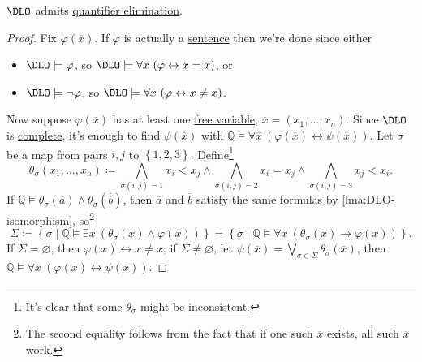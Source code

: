 \begin{theorem}\label{thm:DLO-QE}
	\(\DLO\) admits \hyperref[def:quantifier-elimination]{quantifier elimination}.
\end{theorem}
\begin{proof}
	Fix \(\varphi (\overline{x} )\). If \(\varphi \) is actually a \hyperref[def:sentence]{sentence} then we're done since either
	\begin{itemize}
		\item \(\DLO \models \varphi \), so \(\DLO \models \forall x\ (\varphi \leftrightarrow x = x)\), or
		\item \(\DLO \models \lnot \varphi \), so \(\DLO \models \forall x\ (\varphi \leftrightarrow x \neq x)\).
	\end{itemize}
	Now suppose \(\varphi (\overline{x} )\) has at least one \hyperref[def:free-variable]{free variable}, \(\overline{x} = (x_1, \dots , x_n)\). Since \(\DLO\) is \hyperref[def:theory-complete]{complete}, it's enough to find \(\psi (\overline{x} )\) with \(\mathbb{Q} \models \forall \overline{x} \ (\varphi (\overline{x} ) \leftrightarrow \psi (\overline{x} ))\). Let \(\sigma \) be a map from pairs \(i, j\) to \(\left\{ 1, 2, 3 \right\} \). Define\footnote{It's clear that some \(\theta _\sigma \) might be \hyperref[def:inconsistent]{inconsistent}.}
	\[
		\theta _\sigma (x_1, \dots , x_n) \coloneqq \bigwedge_{\sigma (i, j) = 1} x_i < x_j \land \bigwedge_{\sigma (i, j)=2} x_i = x_j \land \bigwedge_{\sigma (i, j)=3} x_j < x_i.
	\]
	If \(\mathbb{Q} \models \theta _\sigma (\overline{a} ) \land \theta _\sigma (\overline{b} )\), then \(\overline{a} \) and \(\overline{b} \) satisfy the same \hyperref[def:formula]{formulas} by \autoref{lma:DLO-isomorphism}, so\footnote{The second equality follows from the fact that if one such \(\overline{x} \) exists, all such \(\overline{x} \) work.}
	\[
		\Sigma
		\coloneqq \left\{ \sigma \mid \mathbb{Q} \models \exists \overline{x}\ (\theta _\sigma (\overline{x} ) \land \varphi (\overline{x} )) \right\}
		= \left\{ \sigma \mid \mathbb{Q} \models \forall \overline{x}\ (\theta _\sigma (\overline{x} ) \to \varphi (\overline{x} )) \right\}.
	\]
	If \(\Sigma = \varnothing \), then \(\varphi (x) \leftrightarrow x \neq x\); if \(\Sigma \neq \varnothing \), let \(\psi (\overline{x} ) = \bigvee_{\sigma \in \Sigma } \theta _\sigma (\overline{x} ) \), then \(\mathbb{Q} \models \forall \overline{x} \ (\varphi (\overline{x} ) \leftrightarrow \psi (\overline{x} ))\).
\end{proof}